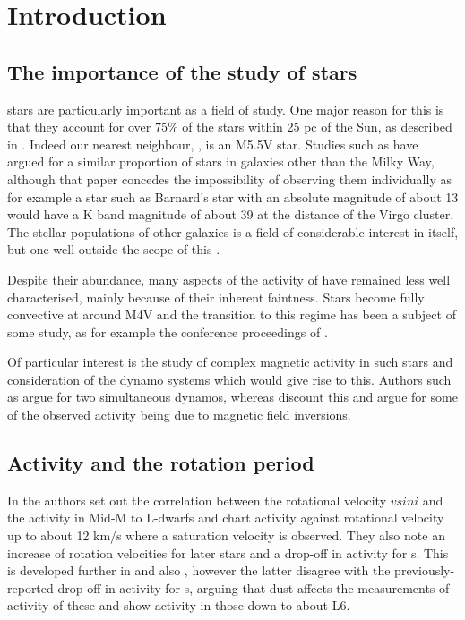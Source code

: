 \chapter{Introduction}
\protect\label{chapter:introduction}

\section{The importance of the study of {\rdwarf} stars}
\protect\label{section:introrwarfs}

{\rdwarf} stars are particularly important as a field of study. One major reason for this is that they account for over
75\% of the stars within 25 pc of the Sun, as described in \citet{winters15}. Indeed our nearest neighbour, \prox, is an
M5.5V star. Studies such as \citet{vandokkum2010} have argued for a similar proportion of {\rdwarf} stars in galaxies
other than the Milky Way, although that paper concedes the impossibility of observing them individually as for example a
star such as Barnard's star with an absolute magnitude of about 13 would have a K band magnitude of about 39 at the
distance of the Virgo cluster. The stellar populations of other galaxies is a field of considerable interest in itself,
but one well outside the scope of this \paperorthesis.

Despite their abundance, many aspects of the activity of {\rdwarf} have remained less well characterised, mainly because
of their inherent faintness. Stars become fully convective at around M4V and the transition to this regime has been a
subject of some study, as for example the conference proceedings of \citet{stassun11}.

Of particular interest is the study of complex magnetic activity in such stars and consideration of the dynamo systems
which would give rise to this. Authors such as \citet{morin11} argue for two simultaneous dynamos, whereas
\citet{kitchatinov14} discount this and argue for some of the observed activity being due to magnetic field inversions.

\section{Activity and the rotation period}
\protect\label{section:introrotation}

In \citet{mohanty03} the authors set out the correlation between the rotational velocity $ v sin i $ and the activity in
Mid-M to L-dwarfs and chart activity against rotational velocity up to about 12 km/s where a saturation velocity is
observed. They also note an increase of rotation velocities for later stars and a drop-off in activity for
\ldwarf s. This is developed further in \citet{reiners08} and also \citet{schmidt14}, however the latter disagree with
the previously-reported drop-off in activity for \ldwarf s, arguing that dust affects the measurements of activity of
these and show activity in those down to about L6.

